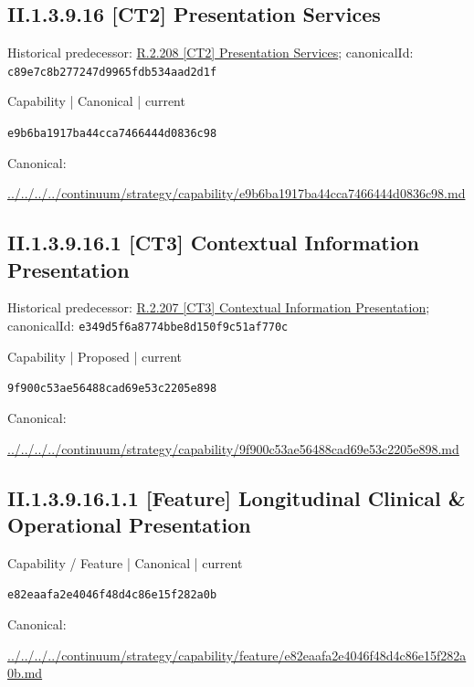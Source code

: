 \documentclass[10pt,a4paper]{article}
\begin{document}
\subsection*{II.1.3.9.16 [CT2] Presentation Services}
Historical predecessor: \hyperref[element-c89e7c8b277247d9965fdb534aad2d1f]{R.2.208 [CT2] Presentation Services}; canonicalId: \texttt{c89e7c8b277247d9965fdb534aad2d1f}\par
\label{element-e9b6ba1917ba44cca7466444d0836c98}
{\small Capability | Canonical | current}\par
\texttt{e9b6ba1917ba44cca7466444d0836c98}\par
Canonical: \par
{\footnotesize\url{../../../../continuum/strategy/capability/e9b6ba1917ba44cca7466444d0836c98.md}}\par
\subsection*{II.1.3.9.16.1 [CT3] Contextual Information Presentation}
Historical predecessor: \hyperref[element-e349d5f6a8774bbe8d150f9c51af770c]{R.2.207 [CT3] Contextual Information Presentation}; canonicalId: \texttt{e349d5f6a8774bbe8d150f9c51af770c}\par
\label{element-9f900c53ae56488cad69e53c2205e898}
{\small Capability | Proposed | current}\par
\texttt{9f900c53ae56488cad69e53c2205e898}\par
Canonical: \par
{\footnotesize\url{../../../../continuum/strategy/capability/9f900c53ae56488cad69e53c2205e898.md}}\par
\subsection*{II.1.3.9.16.1.1 [Feature] Longitudinal Clinical \& Operational Presentation}
\label{element-e82eaafa2e4046f48d4c86e15f282a0b}
{\small Capability / Feature | Canonical | current}\par
\texttt{e82eaafa2e4046f48d4c86e15f282a0b}\par
Canonical: \par
{\footnotesize\url{../../../../continuum/strategy/capability/feature/e82eaafa2e4046f48d4c86e15f282a0b.md}}\par
\end{document}
